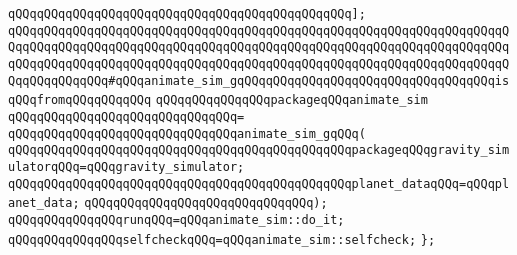 \newline
\verb|qQQqqQQqqQQqqQQqqQQqqQQqqQQqqQQqqQQqqQQqqQQqqQQq];|\newline
\newline
\verb|qQQqqQQqqQQqqQQqqQQqqQQqqQQqqQQqqQQqqQQqqQQqqQQqqQQqqQQqqQQqqQQqqQQqqQQqqQQqqQQqqQQqqQQqqQQqqQQqqQQqqQQqqQQqqQQqqQQqqQQqqQQqqQQqqQQqqQQqqQQqqQQqqQQqqQQqqQQqqQQqqQQqqQQqqQQqqQQqqQQqqQQqqQQqqQQqqQQqqQQqqQQqqQQqqQQqqQQqqQQqqQQq#qQQqanimate_sim_gqQQqqQQqqQQqqQQqqQQqqQQqqQQqqQQqqQQqisqQQqfromqQQqqQQqqQQq|\newline
\newline
\verb|qQQqqQQqqQQqqQQqpackageqQQqanimate_sim|\newline
\verb|qQQqqQQqqQQqqQQqqQQqqQQqqQQqqQQq=|\newline
\verb|qQQqqQQqqQQqqQQqqQQqqQQqqQQqqQQqanimate_sim_gqQQq(|\newline
\verb|qQQqqQQqqQQqqQQqqQQqqQQqqQQqqQQqqQQqqQQqqQQqqQQqpackageqQQqgravity_simulatorqQQq=qQQqgravity_simulator;|\newline
\verb|qQQqqQQqqQQqqQQqqQQqqQQqqQQqqQQqqQQqqQQqqQQqqQQqplanet_dataqQQq=qQQqplanet_data;|\newline
\verb|qQQqqQQqqQQqqQQqqQQqqQQqqQQqqQQq);|\newline
\newline
\verb|qQQqqQQqqQQqqQQqrunqQQq=qQQqanimate_sim::do_it;|\newline
\newline
\verb|qQQqqQQqqQQqqQQqselfcheckqQQq=qQQqanimate_sim::selfcheck;|\newline
\verb|};|\newline

